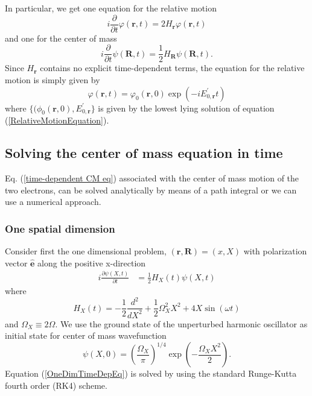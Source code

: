 \documentclass[aip,jcp,reprint,floatfix]{revtex4-1}
\begin{document}
\begin{appendices}
In particular, we get one equation for the relative motion 
\begin{equation}
    i \frac{\partial}{\partial t} \varphi(\mathbf{r},t) = 2H_\mathbf{r} \varphi(\mathbf{r},t)
\end{equation}
and one for the center of mass
\begin{equation}
    i \frac{\partial}{\partial t} \psi(\mathbf{R},t) = \frac{1}{2}H_\mathbf{R} \psi(\mathbf{R},t) \label{time-dependent CM eq}.
\end{equation}
Since $H_\mathbf{r}$ contains no explicit time-dependent terms, the equation for the relative motion is simply given by 
\begin{equation}
    \varphi(\mathbf{r},t) = \varphi_0(\mathbf{r},0) \exp(-i E^\prime_{0,\mathbf{r}} t)
\end{equation}
where $\{(\phi_0(\mathbf{r},0),E^\prime_{0,\mathbf{r}}\}$ is given by the lowest lying solution of equation (\ref{RelativeMotionEquation}).

\subsection{Solving the center of mass equation in time}
Eq. (\ref{time-dependent CM eq}) associated with the center of mass motion of the two electrons, can be solved analytically by means of a path integral\cite{SCHWENGELBECK_1999} or we can use a numerical approach. 

\subsubsection{One spatial dimension}
Consider first the one dimensional problem, $(\mathbf{r},\mathbf{R}) = (x,X)$ with polarization vector $\hat{\mathbf{e}}$ along the positive x-direction 
\begin{align}
    i \frac{\partial \psi(X,t)}{\partial t} &= \frac{1}{2} H_X(t) \psi(X,t) \label{OneDimTimeDepEq}
\end{align}
where 
\begin{equation}
    H_X(t) =  -\frac{1}{2}\frac{d^2}{dX^2} + \frac{1}{2}\Omega_X^2 X^2 + 4X \sin(\omega t) 
\end{equation}
and $\Omega_X \equiv 2\Omega$. We use the ground state of the unperturbed harmonic oscillator as initial state for center of mass wavefunction 
\begin{equation}
    \psi(X,0) = \left( \frac{\Omega_X}{\pi} \right)^{1/4} \exp\left(-\frac{\Omega_X X^2}{2}\right).
\end{equation}
Equation (\ref{OneDimTimeDepEq}) is solved by using the standard Runge-Kutta fourth order (RK4) scheme.


\end{appendices}
\end{document}
